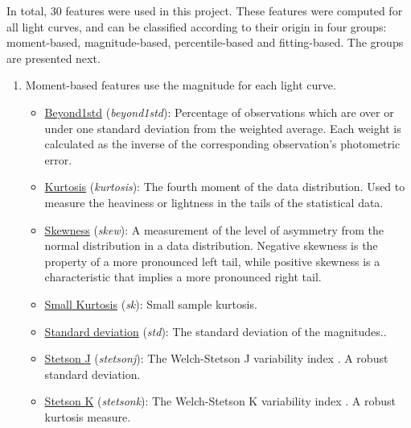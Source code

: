 In total, 30 features were used in this project. These features were computed for all light curves, and can be classified according to their origin in four groups: moment-based, magnitude-based, percentile-based and fitting-based. The groups are presented next.

\begin{enumerate}
    
    \item Moment-based features use the magnitude for each light curve.
    \begin{itemize}
        \item \underline{Beyond1std} (\textit{beyond1std}): 
        Percentage of observations which are over or under one standard deviation from the weighted average. Each weight is calculated as the inverse of the corresponding observation's photometric error.
        \item \underline{Kurtosis} (\textit{kurtosis}): 
        The fourth moment of the data distribution. Used to measure the heaviness or lightness in the tails of the statistical data.
        \item \underline{Skewness} (\textit{skew}): 
        A measurement of the level of asymmetry from the normal distribution in a data distribution. Negative skewness is the property of a more pronounced left tail, while positive skewness is a characteristic that implies a more pronounced right tail.
        \item \underline{Small Kurtosis} (\textit{sk}):
        Small sample kurtosis.
        \item \underline{Standard deviation} (\textit{std}):
        The standard deviation of the magnitudes..
        \item \underline{Stetson J} (\textit{stetson\textunderscore j}):
        The Welch-Stetson J variability index \cite{1996PASP..108..851S}. A robust standard deviation.
        \item \underline{Stetson K} (\textit{stetson\textunderscore k}): 
        The Welch-Stetson K variability index \cite{1996PASP..108..851S}. A robust kurtosis measure.
    \end{itemize}
    

\end{enumerate}

